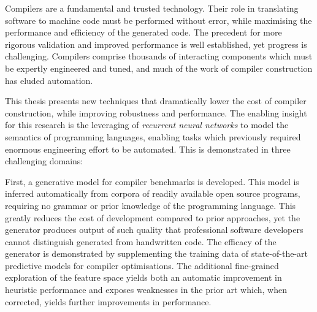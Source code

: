 Compilers are a fundamental and trusted technology. Their role in translating software to machine code must be performed without error, while maximising the performance and efficiency of the generated code. The precedent for more rigorous validation and improved performance is well established, yet progress is challenging.
Compilers comprise thousands of interacting components which must be expertly engineered and tuned, and much of the work of compiler construction has eluded automation.


This thesis presents new techniques that dramatically lower the cost of compiler construction, while improving robustness and performance. The enabling insight for this research is the leveraging of \emph{recurrent neural networks} to model the semantics of programming languages, enabling tasks which previously required enormous engineering effort to be automated. This is demonstrated in three challenging domains:


First, a generative model for compiler benchmarks is developed. This model is inferred automatically from corpora of readily available open source programs, requiring no grammar or prior knowledge of the programming language. This greatly reduces the cost of development compared to prior approaches, yet the generator produces output of such quality that professional software developers cannot distinguish generated from handwritten code. The efficacy of the generator is demonstrated by supplementing the training data of state-of-the-art predictive models for compiler optimisations. The additional fine-grained exploration of the feature space yields both an automatic improvement in heuristic performance and exposes weaknesses in the prior art which, when corrected, yields further improvements in performance.

